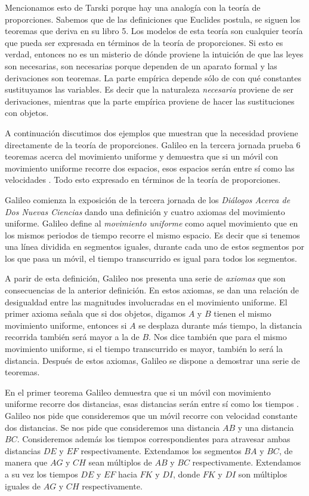 Mencionamos esto de Tarski porque hay una analogía con la teoría de proporciones. Sabemos que de las definiciones que Euclides postula, se siguen los teoremas que deriva en su libro 5. Los modelos de esta teoría son cualquier teoría que pueda ser expresada en términos de la teoría de proporciones. Si esto es verdad, entonces no es un misterio de dónde proviene la intuición de que las leyes son necesarias, son necesarias porque dependen de un aparato formal y las derivaciones son teoremas. La parte empírica depende sólo de con qué constantes sustituyamos las variables. Es decir que la naturaleza \emph{necesaria} proviene de ser derivaciones, mientras que la parte empírica proviene de hacer las sustituciones con objetos.

A continuación discutimos dos ejemplos que muestran que la necesidad proviene directamente de la teoría de proporciones. Galileo en la tercera jornada prueba 6 teoremas acerca del movimiento uniforme y demuestra que si un móvil con movimiento uniforme recorre dos espacios, esos espacios serán entre sí como las velocidades \cite[p. 215]{galtre}. Todo esto expresado en términos de la teoría de proporciones.

Galileo comienza la exposición de la tercera jornada de los \emph{Diálogos Acerca de Dos Nuevas Ciencias} dando una definición y cuatro axiomas del movimiento uniforme. Galileo define al \textit{movimiento uniforme} como aquel movimiento que en los mismos periodos de tiempo recorre el mismo espacio. Es decir que si tenemos una línea dividida en segmentos iguales, durante cada uno de estos segmentos por los que pasa un móvil, el tiempo transcurrido es igual para todos los segmentos.

A parir de esta definición, Galileo nos presenta una serie de \textit{axiomas} que son consecuencias de la anterior definición. En estos axiomas, se dan una relación de desigualdad entre las magnitudes involucradas en el movimiento uniforme. El primer axioma señala que si dos objetos, digamos $A$ y $B$ tienen el mismo movimiento uniforme, entonces si $A$ se desplaza durante más tiempo, la distancia recorrida también será mayor a la de $B$. Nos dice también que para el mismo movimiento uniforme, si el tiempo transcurrido es mayor, también lo será la distancia. Después de estos axiomas, Galileo se dispone a demostrar una serie de teoremas.

En el primer teorema Galileo demuestra que si un móvil con movimiento uniforme recorre dos distancias, esas distancias serán entre sí como los tiempos \cite[p. 215]{galtre}. Galileo nos pide que consideremos que un móvil recorre con velocidad constante dos distancias. Se nos pide que consideremos una distancia $AB$ y una distancia $BC$. Consideremos además los tiempos correspondientes para atravesar ambas distancias $DE$ y $EF$ respectivamente. Extendamos los segmentos $BA$ y $BC$, de manera que $AG$ y $CH$ sean múltiplos de $AB$ y $BC$ respectivamente. Extendamos a su vez los tiempos $DE$ y $EF$ hacia $FK$ y $DI$, donde $FK$ y $DI$ son múltiplos iguales de $AG$ y $CH$ respectivamente.

